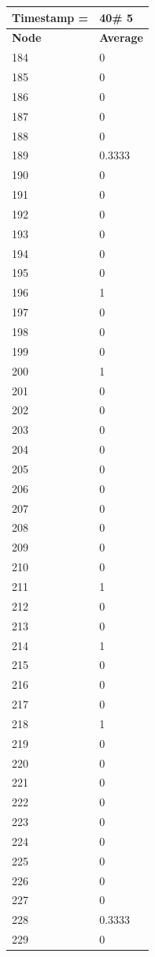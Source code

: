 \begin{tabular}{|l||l|}
\hline
\textbf{Timestamp =} & \textbf{40}\# 5\\\hline
	\textbf{Node} & \textbf{Average} \\ \hline
\hline
	184 & 0 \\ \hline
	185 & 0 \\ \hline
	186 & 0 \\ \hline
	187 & 0 \\ \hline
	188 & 0 \\ \hline
	189 & 0.3333 \\ \hline
	190 & 0 \\ \hline
	191 & 0 \\ \hline
	192 & 0 \\ \hline
	193 & 0 \\ \hline
	194 & 0 \\ \hline
	195 & 0 \\ \hline
	196 & 1 \\ \hline
	197 & 0 \\ \hline
	198 & 0 \\ \hline
	199 & 0 \\ \hline
	200 & 1 \\ \hline
	201 & 0 \\ \hline
	202 & 0 \\ \hline
	203 & 0 \\ \hline
	204 & 0 \\ \hline
	205 & 0 \\ \hline
	206 & 0 \\ \hline
	207 & 0 \\ \hline
	208 & 0 \\ \hline
	209 & 0 \\ \hline
	210 & 0 \\ \hline
	211 & 1 \\ \hline
	212 & 0 \\ \hline
	213 & 0 \\ \hline
	214 & 1 \\ \hline
	215 & 0 \\ \hline
	216 & 0 \\ \hline
	217 & 0 \\ \hline
	218 & 1 \\ \hline
	219 & 0 \\ \hline
	220 & 0 \\ \hline
	221 & 0 \\ \hline
	222 & 0 \\ \hline
	223 & 0 \\ \hline
	224 & 0 \\ \hline
	225 & 0 \\ \hline
	226 & 0 \\ \hline
	227 & 0 \\ \hline
	228 & 0.3333 \\ \hline
	229 & 0 \\ \hline
\end{tabular}
